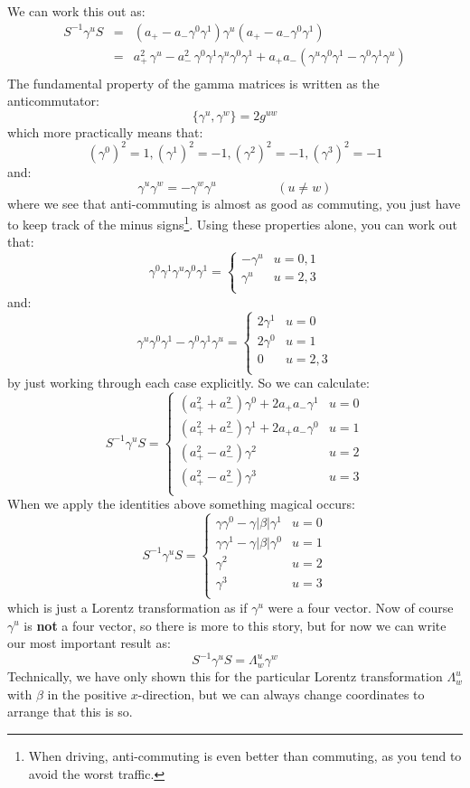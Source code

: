 \documentclass[12pt]{book}
\begin{document}
We can work this out as:
\begin{eqnarray*}
S^{-1} \gamma^u S &=& (a_+ - a_- \gamma^0 \gamma^1) \gamma^u (a_+ - a_- \gamma^0 \gamma^1)\\
&=& a_+^2 \, \gamma^u - a_-^2 \, \gamma^0 \gamma^1 \gamma^u \gamma^0 \gamma^1
+ a_+ a_- (\gamma^u \gamma^0 \gamma^1 - \gamma^0 \gamma^1 \gamma^u)\\
\end{eqnarray*}
The fundamental property of the gamma matrices is written as the anticommutator:
$$\{\gamma^u, \gamma^w\} = 2 g^{uw}$$
which more practically means that:
$$(\gamma^0)^2 = 1, (\gamma^1)^2 = -1, (\gamma^2)^2 = -1, (\gamma^3)^2 = -1$$
and:
$$\gamma^u \gamma^w = -\gamma^w \gamma^u \hspace{2cm} (u \neq w)$$
where we see that anti-commuting is almost as good as commuting, you just have to keep track of the minus signs\footnote{When driving, anti-commuting is even better than commuting, as you tend to avoid the worst traffic.}. Using these properties alone, you can work out that:
$$\gamma^0\gamma^1\gamma^u\gamma^0\gamma^1 = \begin{cases}
- \gamma^u & u=0,1 \\
\gamma^u & u=2,3 \\
\end{cases}$$
and:
$$\gamma^u \gamma^0 \gamma^1 - \gamma^0 \gamma^1 \gamma^u 
= \begin{cases}
2\gamma^1 & u=0 \\
2\gamma^0 & u=1 \\
0 & u=2,3 \\ 
\end{cases}$$
by just working through each case explicitly.  So we can calculate:
$$S^{-1} \gamma^u S = 
\begin{cases}
(a_+^2 + a_-^2) \gamma^0 + 2 a_+ a_- \gamma^1 & u=0 \\
(a_+^2 + a_-^2) \gamma^1 + 2 a_+ a_- \gamma^0 & u=1 \\
(a_+^2 - a_-^2) \gamma^2                      & u=2 \\
(a_+^2 - a_-^2) \gamma^3                      & u=3 \\
\end{cases}$$
When we apply the identities above something magical occurs:
$$S^{-1} \gamma^u S = 
\begin{cases}
\gamma \gamma^0 - \gamma |\beta| \gamma^1 & u=0 \\
\gamma \gamma^1 - \gamma |\beta| \gamma^0 & u=1 \\
\gamma^2                      & u=2 \\
\gamma^3                      & u=3 \\
\end{cases}$$
which is just a Lorentz transformation as if $\gamma^u$ were a four vector.  Now of course $\gamma^u$ is {\bf not} a four vector, so there is more to this story, but for now we can write our most important result as:
$$S^{-1} \gamma^u S = \Lambda^u_w \gamma^w$$
Technically, we have only shown this for the particular Lorentz transformation $\Lambda^u_w$ with $\beta$ in the positive $x$-direction, but we can always change coordinates to arrange that this is so.
\end{document}
